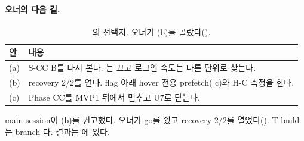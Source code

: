 \paragraph{오너의 다음 길.}
\begin{table}[H]
  \caption{의 선택지. 오너가 (b)를 골랐다().}
  \label{tab:re-u4-opts}
  \centering\small
  \begin{tabularx}{\linewidth}{@{}L{0.9cm} Y@{}}
    \toprule
    안 & 내용 \\
    \midrule
    (a) & S-CC B를 다시 본다. 는 끄고 로그인 속도는 다른 단위로 찾는다. \\
    \midrule
    (b) & recovery 2/2를 연다. flag 아래 hover 전용 prefetch( c)와 H-C 측정을 한다. \\
    \midrule
    (c) & Phase CC를 MVP1 뒤에서 멈추고 U7로 닫는다. \\
    \bottomrule
  \end{tabularx}
\end{table}
main session이 (b)를 권고했다. 오너가 go를 줬고 recovery 2/2를 열었다().
T build는 branch 다. 결과는 에 있다.

